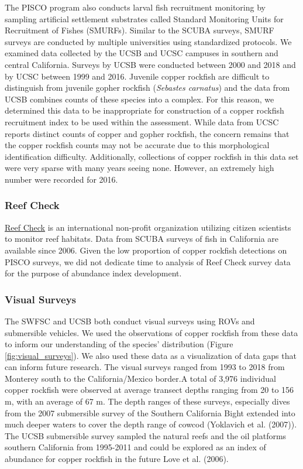 \documentclass[11pt,
  english,
  letterpaper,
]{article}
\begin{document}
The PISCO program also conducts larval fish recruitment monitoring by sampling artificial settlement substrates called Standard Monitoring Units for Recruitment of Fishes (SMURFs). Similar to the SCUBA surveys, SMURF surveys are conducted by multiple universities using standardized protocols. We examined data collected by the UCSB and UCSC campuses in southern and central California. Surveys by UCSB were conducted between 2000 and 2018 and by UCSC between 1999 and 2016. Juvenile copper rockfish are difficult to distinguish from juvenile gopher rockfish (\emph{Sebastes carnatus}) and the data from UCSB combines counts of these species into a complex. For this reason, we determined this data to be inappropriate for construction of a copper rockfish recruitment index to be used within the assessment. While data from UCSC reports distinct counts of copper and gopher rockfish, the concern remains that the copper rockfish counts may not be accurate due to this morphological identification difficulty. Additionally, collections of copper rockfish in this data set were very sparse with many years seeing none. However, an extremely high number were recorded for 2016.

\hypertarget{reef-check}{%
\subsubsection{Reef Check}\label{reef-check}}

\href{https://www.reefcheck.org/}{Reef Check} is an international non-profit organization utilizing citizen scientists to monitor reef habitats. Data from SCUBA surveys of fish in California are available since 2006. Given the low proportion of copper rockfish detections on PISCO surveys, we did not dedicate time to analysis of Reef Check survey data for the purpose of abundance index development.

\hypertarget{visual-surveys}{%
\subsubsection{Visual Surveys}\label{visual-surveys}}

The SWFSC and UCSB both conduct visual surveys using ROVs and submersible vehicles. We used the observations of copper rockfish from these data to inform our understanding of the species' distribution (Figure \ref{fig:visual_surveys}). We also used these data as a visualization of data gaps that can inform future research. The visual surveys ranged from 1993 to 2018 from Monterey south to the California/Mexico border.A total of 3,976 individual copper rockfish were observed at average transect depths ranging from 20 to 156 m, with an average of 67 m. The depth ranges of these surveys, especially dives from the 2007 submersible survey of the Southern California Bight extended into much deeper waters to cover the depth range of cowcod (Yoklavich et al. (2007)). The UCSB submersible survey sampled the natural reefs and the oil platforms southern California from 1995-2011 and could be explored as an index of abundance for copper rockfish in the future Love et al. (2006).
\end{document}
